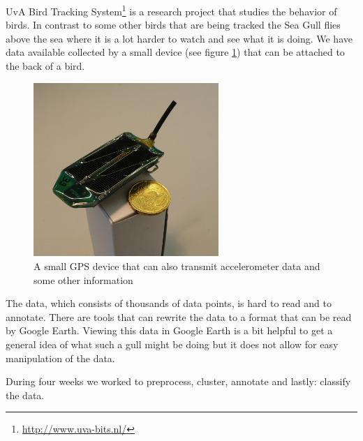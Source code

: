 UvA Bird Tracking System\footnote{\url{http://www.uva-bits.nl/} } is a research 
project that studies the behavior of
birds. 
In contrast to some other birds that are being tracked the Sea Gull flies above the 
sea where it is a lot harder to watch and see what it is doing. We have data available
collected by a small device (see figure \ref{fig:gpsDevice}) that can be attached to 
the back of a bird. 

\begin{figure}[h]
    \center
    \includegraphics[width=7cm]{device}
    \caption{A small GPS device that can also transmit accelerometer data and some other
information}
    \label{fig:gpsDevice}
\end{figure}

The data, which consists of thousands of data points, is hard to read and to annotate. 
There are tools that can rewrite the data to a format that can be read by Google Earth. 
Viewing this data in Google Earth is a bit helpful to get a general idea of what such 
a gull might be doing but it does not allow for easy manipulation of the data. 

During four weeks we worked to preprocess, cluster, annotate
and lastly: classify the data. 


